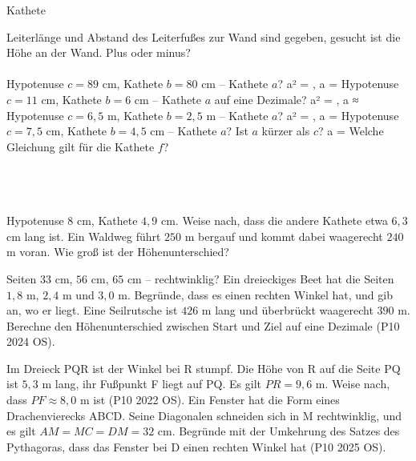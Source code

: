 \begin{aufgabe}{Kathete}
\begin{teile}
\teil Leiterlänge und Abstand des Leiterfußes zur Wand sind gegeben, gesucht ist die Höhe an der Wand. Plus oder minus? \\  \\ 
\teil Hypotenuse $c = 89$ cm, Kathete $b = 80$ cm – Kathete $a$? a² = \leerfeld , a = \leerfeld[cm]
\teil Hypotenuse $c = 11$ cm, Kathete $b = 6$ cm – Kathete $a$ auf eine Dezimale? a² = \leerfeld , a ≈ \leerfeld[cm]
\teil Hypotenuse $c = 6{,}5$ m, Kathete $b = 2{,}5$ m – Kathete $a$? a² = \leerfeld , a = \leerfeld[m]
\teil Hypotenuse $c = 7{,}5$ cm, Kathete $b = 4{,}5$ cm – Kathete $a$? Ist $a$ kürzer als $c$? a = \leerfeld[cm]
\teil Welche Gleichung gilt für die Kathete $f$? \\  \\  \\  \\ 

\teil Hypotenuse $8$ cm, Kathete $4{,}9$ cm. Weise nach, dass die andere Kathete etwa $6{,}3$ cm lang ist.
\teil Ein Waldweg führt $250$ m bergauf und kommt dabei waagerecht $240$ m voran. Wie groß ist der Höhenunterschied?

\leerfeld[m]
\teil Seiten $33$ cm, $56$ cm, $65$ cm – rechtwinklig?
\teil Ein dreieckiges Beet hat die Seiten $1{,}8$ m, $2{,}4$ m und $3{,}0$ m. Begründe, dass es einen rechten Winkel hat, und gib an, wo er liegt.
\teil Eine Seilrutsche ist $426$ m lang und überbrückt waagerecht $390$ m. Berechne den Höhenunterschied zwischen Start und Ziel auf eine Dezimale \hfill (P10 2024 OS).

\leerfeld[m]
\teil Im Dreieck PQR ist der Winkel bei R stumpf. Die Höhe von R auf die Seite PQ ist $5{,}3$ m lang, ihr Fußpunkt F liegt auf PQ. Es gilt $PR = 9{,}6$ m. Weise nach, dass $PF \approx 8{,}0$ m ist \hfill (P10 2022 OS).
\teil Ein Fenster hat die Form eines Drachenvierecks ABCD. Seine Diagonalen schneiden sich in M rechtwinklig, und es gilt $AM = MC = DM = 32$ cm. Begründe mit der Umkehrung des Satzes des Pythagoras, dass das Fenster bei D einen rechten Winkel hat \hfill (P10 2025 OS).
\end{teile}
\end{aufgabe}


